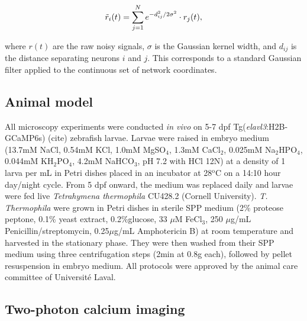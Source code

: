 \documentclass{article}
\begin{document}
$$\Tilde{r}_i(t)=\sum_{j=1}^N e^{-d_{ij}^2/2\sigma^2} \cdot r_j(t), $$

where $r(t)$ are the raw noisy signals, $\sigma$ is the Gaussian kernel width, and $d_{ij}$ is the distance separating neurons $i$ and $j$. This corresponds to a standard Gaussian filter applied to the continuous set of network coordinates.

\subsection*{Animal model}

All microscopy experiments were conducted \textit{in vivo} on 5-7 dpf Tg(\textit{elavl3}:H2B-GCaMP6s) (cite) zebrafish larvae. Larvae were raised in embryo medium (13.7mM NaCl, 0.54mM KCl, 1.0mM MgSO$_{4}$, 1.3mM CaCl$_{2}$, 0.025mM Na$_{2}$HPO$_{4}$, 0.044mM KH$_{2}$PO$_{4}$, 4.2mM NaHCO$_{3}$, pH 7.2 with HCl 12N) at a density of 1 larva per mL in Petri dishes placed in an incubator at 28$^{\text{o}}$C on a 14:10 hour day/night cycle. From 5 dpf onward, the medium was replaced daily and larvae were fed live \textit{Tetrahymena thermophila} CU428.2 (Cornell University). \textit{T. Thermophila} were grown in Petri dishes in sterile SPP medium (2\% proteose peptone, 0.1\% yeast extract, 0.2\%glucose, 33 $\mu$M FeCl$_{3}$, 250 $\mu$g/mL Penicillin/streptomycin, 0.25$\mu$g/mL Amphotericin B) at room temperature and harvested in the stationary phase. They were then washed from their SPP medium using three centrifugation steps (2min at 0.8g each), followed by pellet resuspension in embryo medium. All protocols were approved by the animal care committee of Université Laval.

\subsection*{Two-photon calcium imaging}
\end{document}
